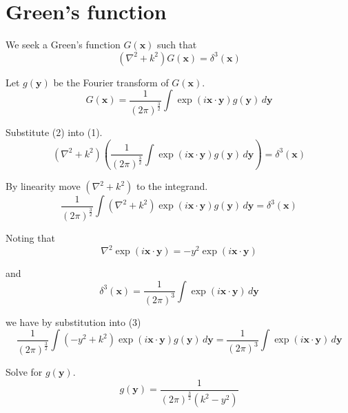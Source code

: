

\section*{Green's function}

We seek a Green's function $G(\mathbf x)$ such that
\begin{equation*}
\left(\nabla^2+k^2\right)G(\mathbf x)=\delta^3(\mathbf x)
\tag{1}
\end{equation*}

Let $g(\mathbf y)$ be the Fourier transform of $G(\mathbf x)$.
\begin{equation*}
G(\mathbf x)=\frac{1}{(2\pi)^\frac{3}{2}}\int\exp(i\mathbf x\cdot\mathbf y)g(\mathbf y)\,d\mathbf y
\tag{2}
\end{equation*}

Substitute (2) into (1).
\begin{equation*}
\left(\nabla^2+k^2\right)
\left(\frac{1}{(2\pi)^\frac{3}{2}}\int\exp(i\mathbf x\cdot\mathbf y)g(\mathbf y)\,d\mathbf y\right)
=\delta^3(\mathbf x)
\end{equation*}

By linearity move $(\nabla^2+k^2)$ to the integrand.
\begin{equation*}
\frac{1}{(2\pi)^\frac{3}{2}}
\int\left(\nabla^2+k^2\right)\exp(i\mathbf x\cdot\mathbf y)g(\mathbf y)\,d\mathbf y
=\delta^3(\mathbf x)
\tag{3}
\end{equation*}

Noting that
\begin{equation*}
\nabla^2\exp(i\mathbf x\cdot\mathbf y)=-y^2\exp(i\mathbf x\cdot\mathbf y)
\end{equation*}

and
\begin{equation*}
\delta^3(\mathbf x)=\frac{1}{(2\pi)^3}\int\exp(i\mathbf x\cdot\mathbf y)\,d\mathbf y
\end{equation*}

we have by substitution into (3)
\begin{equation*}
\frac{1}{(2\pi)^\frac{3}{2}}
\int\left(-y^2+k^2\right)\exp(i\mathbf x\cdot\mathbf y)g(\mathbf y)\,d\mathbf y
=\frac{1}{(2\pi)^3}\int\exp(i\mathbf x\cdot\mathbf y)\,d\mathbf y
\end{equation*}

Solve for $g(\mathbf y)$.
\begin{equation*}
g(\mathbf y)=\frac{1}{(2\pi)^\frac{3}{2}\left(k^2-y^2\right)}
\end{equation*}

